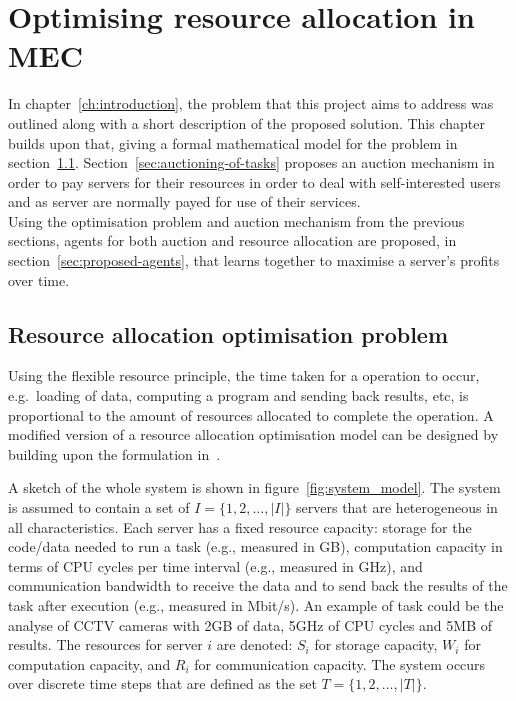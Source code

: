 

\chapter{Optimising resource allocation in MEC}\label{ch:optimising-resource-allocation-in-mec}
In chapter~\ref{ch:introduction}, the problem that this project aims to address was outlined along with a short
description of the proposed solution. This chapter builds upon that, giving a formal mathematical model for the problem
in section~\ref{sec:optimisation-problem}. Section~\ref{sec:auctioning-of-tasks} proposes an auction mechanism in order
to pay servers for their resources in order to deal with self-interested users and as server are normally payed for
use of their services. \\
Using the optimisation problem and auction mechanism from the previous sections, agents for both auction and resource
allocation are proposed, in section~\ref{sec:proposed-agents}, that learns together to maximise a server's profits
over time.

\section{Resource allocation optimisation problem}\label{sec:optimisation-problem}
Using the flexible resource principle, the time taken for a operation to occur, e.g.\ loading of data, computing
a program and sending back results, etc, is proportional to the amount of resources allocated to complete the operation.
A modified version of a resource allocation optimisation model can be designed by building upon the formulation
in~\cite{FlexibleResourceAllocation}.

A sketch of the whole system is shown in figure~\ref{fig:system_model}.
The system is assumed to contain a set of $I = \{1,2,\ldots,\left|I\right|\}$ servers that are heterogeneous in all
characteristics. Each server has a fixed resource capacity: storage for the code/data needed to run a task
(e.g., measured in GB), computation capacity in terms of CPU cycles per time interval (e.g., measured in GHz),
and communication bandwidth to receive the data and to send back the results of the task after execution
(e.g., measured in Mbit/s). An example of task could be the analyse of CCTV cameras with 2GB of data, 5GHz of CPU
cycles and 5MB of results. The resources for server $i$ are denoted: $S_i$ for storage capacity, $W_i$ for computation
capacity, and $R_i$ for communication capacity. The system occurs over discrete time steps that are defined as the set
$T = \{1,2,\ldots,\left|T\right|\}$.

